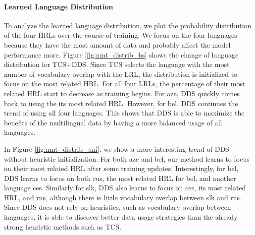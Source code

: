 \paragraph{Learned Language Distribution} To analyze the learned language distribution, we plot the probability distribution of the four HRLs over the course of training. We focus on the four languages because they have the most amount of data and probably affect the model performance more.  Figure \ref{fig:nmt_distrib_hs} shows the change of language distribution for TCS+DDS. Since TCS selects the language with the most number of vocabulary overlap with the LRL, the distribution is initialized to focus on the most related HRL. For all four LRLs, the percentage of their most related HRL start to decrease as training begins. For aze, DDS quickly comes back to using the its most related HRL. However, for bel, DDS continues the trend of using all four languages. This shows that DDS is able to maximize the benefits of the multilingual data by having a more balanced usage of all languages. 

In Figure \ref{fig:nmt_distrib_uni}, we show a more interesting trend of DDS without heuristic initialization. For both aze and bel, our method learns to focus on their most related HRL after some training updates.
Interestingly, for bel, DDS learns to focus on both rus, the most related HRL for bel, and another language ces. Similarly for slk, DDS also learns to focus on ces, its most related HRL, and rus, although there is little vocabulary overlap between slk and rus. Since DDS does not rely on heuristics, such as vocabulary overlap between languages, it is able to discover better data usage strategies than the already strong heuristic methods such as TCS.
